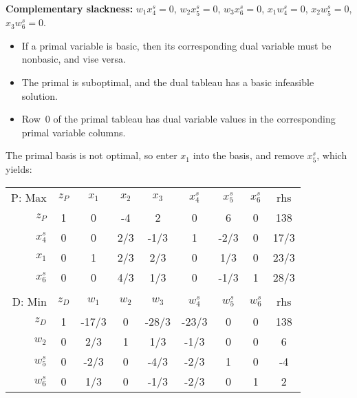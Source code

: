 {\color{red} \bf Complementary slackness:} $w_1 x^s_4=0$, $w_2 x^s_5=0$, $w_3 x^s_6=0$, $x_1 w^s_4=0$,  $x_2 w^s_5=0$, $x_3 w^s_6=0$. \\
\vspace{-2mm}\begin{itemize}
\item If a primal variable is basic, then its corresponding dual variable must be nonbasic, and vise versa.   
\item The primal is suboptimal, and the dual tableau has a basic infeasible solution.
\item Row~0 of the primal tableau has dual variable values in the corresponding primal variable columns. 
\end{itemize}

The primal basis is not optimal, so enter $x_1$ into the basis, and remove $x^s_5$, which yields:  

\begin{center} \begin{tabular} {r|c|c|c|c|c|c|c|c|} \cline{2-9} 
P: Max & $z_P$ 	& $x_1$ 	& $x_2$ 	& $x_3$ 	& $x^{s}_4$ 	& $x^{s}_5$ 	& $x^{s}_6$ 	& rhs   \\ \cline{2-9}  
$z_P$	& 1  		& 0   		& -4   	& 2   		& 0    	& 6      	& 0     	& 138   \\ \cline{2-9}  
$x^{s}_4$	& 0  		& 0     & 2/3   	& -1/3    	& 1    	& -2/3     & 0     	& 17/3  \\ \cline{2-9} 
$x_1$	& 0  		& 1     	& 2/3    	& 2/3     	& 0    	& 1/3     	& 0     	& 23/3  \\ \cline{2-9} 
$x^{s}_6$ 	& 0  		& 0     	& 4/3     	& 1/3    	& 0    	& -1/3      & 1     	& 28/3   \\ \cline{2-9}
\multicolumn{9}{c}{ } \\ \cline{2-9}
D: Min& $z_D$ 	& $w_1$ 	& $w_2$ 	& $w_3$ 	& $w^{s}_4$ 	& $w^{s}_5$ 	& $w^{s}_6$ 	& rhs   \\ \cline{2-9}   
$z_D$	& 1    	& -17/3  	& 0     	& -28/3   & -23/3   & 0    		& 0     	& 138   	\\ \cline{2-9}  
$w_2$	& 0    	& 2/3   	& 1     	& 1/3    	& -1/3 	& 0  		& 0     	& 6   \\ \cline{2-9}   
$w^{s}_5$ 	& 0    	& -2/3   	& 0    & -4/3    	& -2/3  	& 1   		& 0     	& -4   \\ \cline{2-9}   
$w^{s}_6$	& 0    	& 1/3   	& 0    & -1/3  	& -2/3  	& 0  		& 1     	& 2    \\ \cline{2-9} 
\end{tabular} \end{center}

